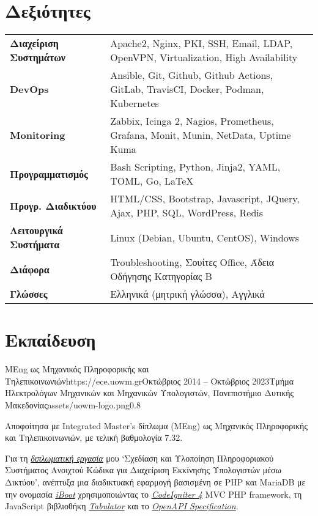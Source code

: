\documentclass{mycv}
\begin{document}
	\section{Δεξιότητες}
	\begin{tabular}{m{4.5cm} m{12.5cm}}
		\textbf{Διαχείριση Συστημάτων} & Apache2, Nginx, PKI, SSH, Email, LDAP, OpenVPN, Virtualization, High Availability \\
		\textbf{DevOps}	               & Ansible, Git, Github, Github Actions, GitLab, TravisCI, Docker, Podman, Kubernetes \\
		\textbf{Monitoring}            & Zabbix, Icinga 2, Nagios, Prometheus, Grafana, Monit, Munin, NetData, Uptime Kuma \\
		\textbf{Προγραμματισμός} 	   & Bash Scripting, Python, Jinja2, YAML, TOML, Go, \LaTeX \\
		\textbf{Προγρ. Διαδικτύου}	   & HTML/CSS, Bootstrap, Javascript, JQuery, Ajax, PHP, SQL, WordPress, Redis \\
		\textbf{Λειτουργικά Συστήματα} & Linux (Debian, Ubuntu, CentOS), Windows \\
		\textbf{Διάφορα}        	   & Troubleshooting, Σουίτες Office, Άδεια Οδήγησης Κατηγορίας Β \\
		\textbf{Γλώσσες} 			   & Ελληνικά (μητρική γλώσσα), Αγγλικά 
	\end{tabular}

	\section{Εκπαίδευση}
	\begin{EntryDatedLogo}{MEng ως Μηχανικός Πληροφορικής και Τηλεπικοινωνιών}{https://ece.uowm.gr}{Οκτώβριος 2014 -- Οκτώβριος 2023}{Τμήμα Ηλεκτρολόγων Μηχανικών και Μηχανικών Υπολογιστών, Πανεπιστήμιο Δυτικής Μακεδονίας}{assets/uowm-logo.png}{0.8}
		\begin{Itemize}
			\item Αποφοίτησα με Integrated Master's δίπλωμα (MΕng) ως Μηχανικός Πληροφορικής και Τηλεπικοινωνιών, με τελική βαθμολογία 7.32.
			\item Για τη \href{https://github.com/ChrisKar96/Thesis}{\textit{διπλωματική εργασία}} μου `Σχεδίαση και Υλοποίηση Πληροφοριακού Συστήματος Ανοιχτού Κώδικα για Διαχείριση Εκκίνησης Υπολογιστών μέσω Δικτύου', ανέπτυξα μια διαδικτυακή εφαρμογή βασισμένη σε PHP και MariaDB με την ονομασία \href{https://github.com/ChrisKar96/iBoot-Thesis}{\textit{iBoot}} χρησιμοποιώντας το \href{https://codeigniter.com/}{\textit{CodeIgniter 4}} MVC PHP framework, τη JavaScript βιβλιοθήκη \href{https://tabulator.info/}{\textit{Tabulator}} και το \href{https://swagger.io/specification/}{\textit{OpenAPI Specification}}.
		\end{Itemize}
	\end{EntryDatedLogo}
\end{document}
